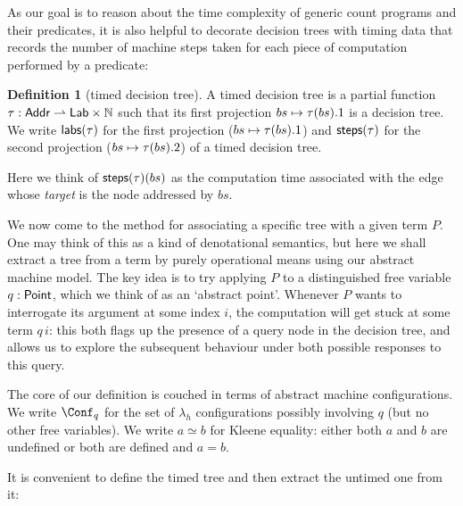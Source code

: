 \documentclass[12pt,phd,lfcs,twoside,openright,logo,leftchapter,normalheadings]{infthesis}
\theoremstyle{plain}
\theoremstyle{definition}
\newtheorem{definition}[theorem]{Definition}
\begin{document}
As our goal is to reason about the time complexity of generic count
programs and their predicates, it is also helpful to decorate decision
trees with timing data that records the number of machine steps taken
for each piece of computation performed by a predicate:

\begin{definition}[timed decision tree]\label{def:timed-decision-tree}
A timed decision tree is a partial function $\tau : \mathsf{Addr} \rightharpoonup
\mathsf{Lab} \times \mathbb{N}$ such that its first projection $bs \mapsto \tau(bs).1$
is a decision tree.
%
We write $\mathsf{labs}(\tau)$ for the first projection ($bs \mapsto \tau(bs).1$) and
$\mathsf{steps}(\tau)$ for the second projection ($bs \mapsto \tau(bs).2$) of a timed
decision tree.
\end{definition}

Here we think of $\mathsf{steps}(\tau)(bs)$ as the computation time
associated with the edge whose \emph{target} is the node addressed by
$bs$.

We now come to the method for associating a specific tree with a given
term $P$. One may think of this as a kind of denotational semantics,
but here we shall extract a tree from a term by purely operational
means using our abstract machine model. The key idea is to try
applying $P$ to a distinguished free variable $q: \mathsf{Point}$, which we
think of as an `abstract point'. Whenever $P$ wants to interrogate its
argument at some index $i$, the computation will get stuck at some
term $q\,i$: this both flags up the presence of a query node in the
decision tree, and allows us to explore the subsequent behaviour under
both possible responses to this query.

The core of our definition is couched in terms of abstract machine configurations.
We write $\Conf_q$ for the set of $\lambda_h$ configurations possibly involving $q$
(but no other free variables).
We write $a \simeq b$ for Kleene equality: either both $a$ and $b$ are
undefined or both are defined and $a = b$.

It is convenient to define the timed tree and then extract the untimed one from it:
\end{document}
